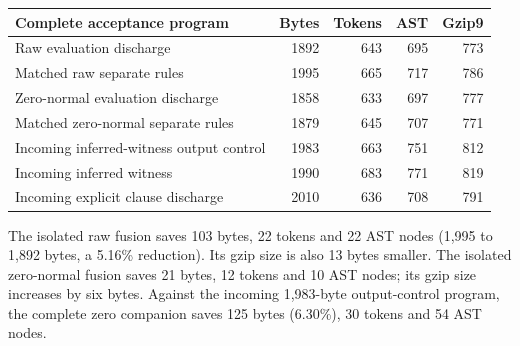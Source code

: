 \begin{center}\small
\begin{tabularx}{\textwidth}{@{}Xrrrr@{}}
\toprule
Complete acceptance program & Bytes & Tokens & AST & Gzip9\\
\midrule
Raw evaluation discharge & 1892 & 643 & 695 & 773\\
Matched raw separate rules & 1995 & 665 & 717 & 786\\
Zero-normal evaluation discharge & 1858 & 633 & 697 & 777\\
Matched zero-normal separate rules & 1879 & 645 & 707 & 771\\
Incoming inferred-witness output control & 1983 & 663 & 751 & 812\\
Incoming inferred witness & 1990 & 683 & 771 & 819\\
Incoming explicit clause discharge & 2010 & 636 & 708 & 791\\
\bottomrule
\end{tabularx}
\end{center}

The isolated raw fusion saves 103 bytes, 22 tokens and 22 AST nodes
(1,995 to 1,892 bytes, a 5.16\% reduction). Its gzip size is also 13 bytes
smaller. The isolated zero-normal fusion saves 21 bytes, 12 tokens and
10 AST nodes; its gzip size increases by six bytes. Against the incoming
1,983-byte output-control program, the complete zero companion saves
125 bytes (6.30\%), 30 tokens and 54 AST nodes.
